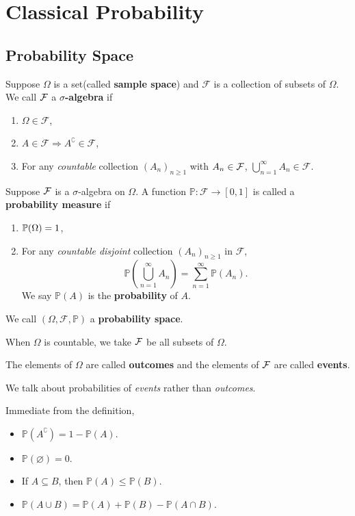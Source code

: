 \section{Classical Probability}
\subsection{Probability Space}
\begin{definition}
    Suppose $ \Omega $ is a set(called \textbf{sample space}) and $ \mathscr{F} $ is a collection of subsets of $ \Omega $. We call ${\mathcal{F}}$ a \textbf{$\sigma$-algebra} if 
    \begin{enumerate}
        \item $ \Omega\in \mathscr{F} $,
        \item $ A\in \mathscr{F} \Rightarrow A^\complement \in \mathscr{F} $,
        \item For any \textit{countable} collection $ (A_n)_{n\ge 1} $ with $A_n\in {\mathcal{F}}$, $ \bigcup_{n=1}^{\infty}A_n\in \mathscr{F} $.
    \end{enumerate}
    Suppose ${\mathcal{F}}$ is a $ \sigma $-algebra on $ \Omega $. A function $ \mathbb{P}:\mathscr{F}\to [0,1] $ is called a \textbf{probability measure} if
    \begin{enumerate}
        \item $ {\mathbb{P}}(\Omega)=1 $,
        \item For any \textit{countable disjoint} collection $ (A_n)_{n\ge 1} $ in $ \mathscr{F} $, 
        \[
            \mathbb{P}\left( \bigcup_{n=1}^{\infty}A_n \right) = \sum_{n=1}^{\infty} \mathbb{P}(A_n).
        \]
        We say $ \mathbb{P}(A) $ is the \textbf{probability} of $A$.
    \end{enumerate}
    We call $ (\Omega,\mathscr{F},\mathbb{P}) $ a \textbf{probability space}.
\end{definition}
\begin{remark}
    When $ \Omega $ is countable, we take ${\mathcal{F}}$ be all subsets of $ \Omega $.
\end{remark}
\begin{definition}
    The elements of $ \Omega $ are called \textbf{outcomes} and the elements of ${\mathcal{F}}$ are called \textbf{events}.
\end{definition}
\begin{remark}
    We talk about probabilities of \textit{events} rather than \textit{outcomes}.
\end{remark}
\begin{proposition}\label{prop:Properties of P}
    Immediate from the definition,
    \begin{itemize}
        \item $ \mathbb{P}(A^\complement) = 1 - \mathbb{P}(A) $.
        \item $ \mathbb{P}(\varnothing)=0 $.
        \item If $ A \subseteq B $, then $ \mathbb{P}(A) \le \mathbb{P}(B) $.
        \item $ \mathbb{P}(A \cup B) = \mathbb{P}(A)+\mathbb{P}(B)-\mathbb{P}(A \cap B) $.
    \end{itemize}
\end{proposition}
